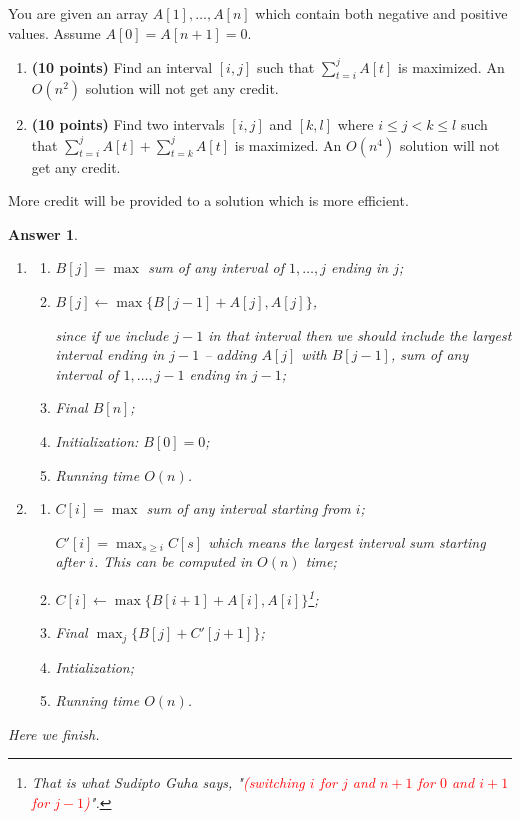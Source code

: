 \documentclass[11pt]{article}
\theoremstyle{numberplain}
\theoremstyle{nonumberplain}
\newtheorem{ans}{Answer}
\newcommand{\0}{{\mathbf{0}}}
\begin{document}
\begin{ques} 
You are given an array $A[1],\ldots,A[n]$ which contain both negative and
positive values. Assume $A[0] = A[n + 1] = 0$.
\begin{enumerate} 
\item \textbf{(10 points)} Find an interval $[i, j]$ such that
$\sum_{t=i}^j A[t]$ is maximized. An $O(n^2)$ solution will not get any credit.
\item \textbf{(10 points)} Find two intervals $[i,j]$ and $[k,l]$ where $i \leq j < k\leq l$ such that
$\sum^j_{t=i} A[t]+
\sum^j_{t=k} A[t]$
is maximized. An $O(n^4)$ solution will not get any credit.
\end{enumerate}
More credit will be provided to a solution which is more efficient. 
\end{ques}
\begin{ans}
\begin{enumerate}
\item 
\begin{enumerate}
\item $B[j]=\max $ sum of any interval of $1,\ldots,j$ ending in $j$;
\item $B[j] \leftarrow \max\{B[j - 1] + A[j], A[j]\}$,

 since if we
include $j-1$ in that interval then we should include the largest interval ending in $j-1$ -- adding $A[j]$ with $B[j-1]$, sum of any interval of $1,\ldots, j-1$ ending in $j-1$;
\item Final $B[n]$;
\item Initialization: $B[0]=0$;
\item Running time $O(n)$.
\end{enumerate}
\item 
\begin{enumerate}
\item $C[i]=\max$ sum of any interval starting from $i$;

$C'[i]=\max_{s\geq i} C[s]$ which means the largest interval sum starting after $i$.  This can be computed in $O(n)$ time;
\item $C[i]\leftarrow \max\{ B[i+1]+A[i], A[i] \}$\footnote{That is what Sudipto Guha says, "\textcolor{red}{(switching $i$ for $j$ and $n+1$ for $0$ and $i+1$ for $j -1$)}".};
\item Final $\max_j \{B[j] + C'[j + 1]\}$;
\item Intialization;
\item Running time $O(n)$.
\end{enumerate}
\end{enumerate}
Here we finish.
\end{ans}
\end{document}
